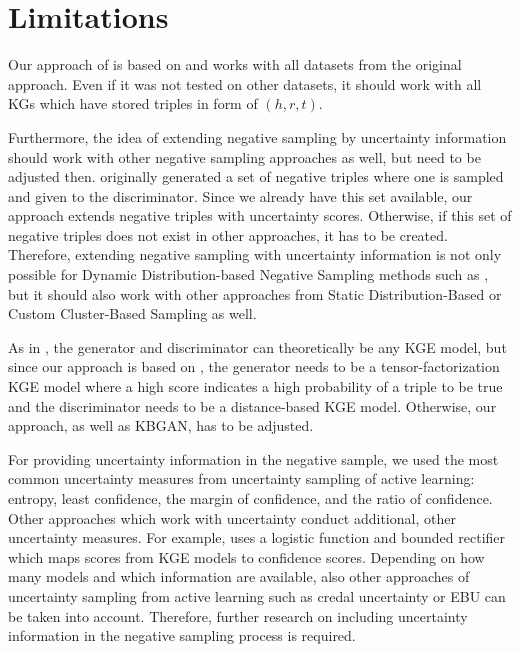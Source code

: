 \section{Limitations}  
\label{sec:limitations}
%
Our approach of \usgan is based on \kbgan and works with all datasets from the original approach.
Even if it was not tested on other datasets, it should work with all \acp{KG} which have stored triples in form of $(h,r,t)$.

Furthermore, the idea of extending negative sampling by uncertainty information should work with other negative sampling approaches as well, but need to be adjusted then.
\kbgan originally generated a set of negative triples where one is sampled and given to the discriminator.
Since we already have this set available, our approach extends negative triples with uncertainty scores.
Otherwise, if this set of negative triples does not exist in other approaches, it has to be created.
Therefore, extending negative sampling with uncertainty information is not only possible for Dynamic Distribution-based Negative Sampling methods such as \kbgan, but it should also work with other approaches from Static Distribution-Based or Custom Cluster-Based Sampling as well.

As in \kbgan, the generator and discriminator can theoretically be any \ac{KGE} model, but since our approach is based on \kbgan, the generator needs to be a tensor-factorization \ac{KGE} model where a high score indicates a high probability of a triple to be true and the discriminator needs to be a distance-based \ac{KGE} model.
Otherwise, our approach, as well as \textsc{KBGAN}, has to be adjusted.

For providing uncertainty information in the negative sample, we used the most common uncertainty measures from uncertainty sampling of active learning:
entropy, least confidence, the margin of confidence, and the ratio of confidence.
Other approaches which work with uncertainty conduct additional, other uncertainty measures.
For example, \cite{UKGE} uses a logistic function and bounded rectifier which maps scores from \ac{KGE} models to confidence scores.
Depending on how many models and which information are available, also other approaches of uncertainty sampling from active learning such as credal uncertainty or \ac{EBU} can be taken into account.
Therefore, further research on including uncertainty information in the negative sampling process is required.


